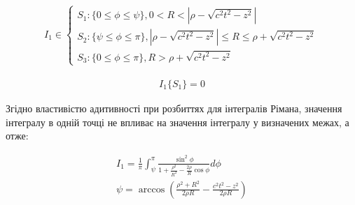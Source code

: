 \begin{equation*} \begin{aligned}
I_1 \in \begin{cases}
S_1: \{ 0 \leq \phi \leq \psi \}, 0 < R < 
\left| \rho - \sqrt{c^2 t^2 - z^2} \right| \\
S_2: \{ \psi \leq \phi \leq \pi \}, \left| \rho - \sqrt{c^2 t^2 - z^2} \right| \leq 
R \leq \rho + \sqrt{c^2 t^2 - z^2} \\
S_3: \{ 0 \leq \phi \leq \pi \}, R > \rho + \sqrt{c^2 t^2 - z^2}
\end{cases} 
\end{aligned} \end{equation*}

\begin{equation*} \begin{aligned}
I_1 \{ S_1 \} = 0
\end{aligned} \end{equation*}


Згідно властивістю адитивності при розбиттях для інтегралів Рімана, 
значення інтегралу в одній точці не впливає на значення інтегралу у 
визначених межах, а отже:

\begin{equation*} \begin{aligned}
I_1 = \frac{1}{\pi} \int_{\psi}^{\pi}
\frac{\sin^2{\phi}}{1 + \frac{\rho^2}{R^2} - 
\frac{2 \rho}{R} \cos \phi} d \phi \\
\psi = \arccos \left( \frac{\rho^2 + R^2}{2 \rho R} - 
\frac{c^2 t^2 - z^2}{2 \rho R} \right)
\end{aligned} \end{equation*}

